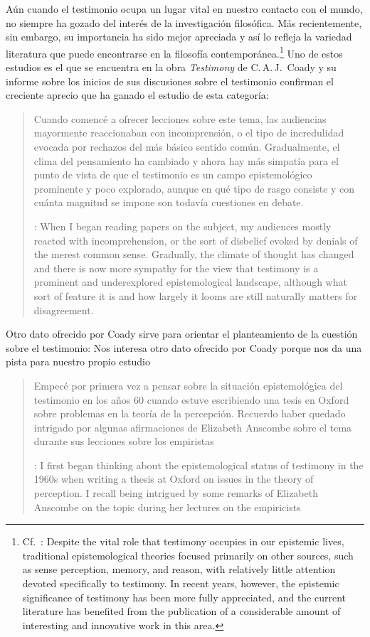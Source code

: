 Aún cuando el testimonio ocupa un lugar vital en nuestro contacto con el mundo,
no siempre ha gozado del interés de la investigación filosófica. Más
recientemente, sin embargo, su importancia ha sido mejor apreciada y así lo
refleja la variedad literatura que puede encontrarse en la filosofía
contemporánea.\footnote{Cf.~\cite[1]{lackeysosa2006eptest}: Despite the vital
  role that testimony occupies in our epistemic lives, traditional
  epistemological theories focused primarily on other sources, such as sense
  perception, memory, and reason, with relatively little attention devoted
  specifically to testimony. In recent years, however, the epistemic
  significance of testimony has been more fully appreciated, and the current
  literature has benefited from the publication of a considerable amount of
  interesting and innovative work in this area.} Uno de estos estudios es el que
se encuentra en la obra \emph{Testimony} de C.\,A.\,J.~Coady y su informe sobre
los inicios de sus discusiones sobre el testimonio confirman el creciente
aprecio que ha ganado el estudio de esta categoría:
\blockquote[{\cite[vii]{coady1992test}}: When I began reading papers on the
subject, my audiences mostly reacted with incomprehension, or the sort of
disbelief evoked by denials of the merest common sense. Gradually, the climate
of thought has changed and there is now more sympathy for the view that
testimony is a prominent and underexplored epistemological landscape, although
what sort of feature it is and how largely it looms are still naturally matters
for disagreement.]{Cuando comencé a ofrecer lecciones sobre este tema, las
  audiencias mayormente reaccionaban con incomprensión, o el tipo de
  incredulidad evocada por rechazos del más básico sentido común. Gradualmente,
  el clima del pensamiento ha cambiado y ahora hay más simpatía para el punto de
  vista de que el testimonio es un campo epistemológico prominente y poco
  explorado, aunque en qué tipo de rasgo consiste y con cuánta magnitud se
  impone son todavía cuestiones en debate.}
Otro dato ofrecido por Coady sirve para orientar el planteamiento de la cuestión
sobre el testimonio:
Nos interesa otro dato ofrecido por Coady porque nos da una pista para nuestro
propio estudio
\blockquote[{\cite[vii]{coady1992test}}: I first began thinking about the
epistemological status of testimony in the 1960s when writing a thesis at Oxford
on issues in the theory of perception. \textelp{} I recall being intrigued by
some remarks of Elizabeth Anscombe on the topic during her lectures on the
empiricists \textelp{}]{Empecé por primera vez a pensar sobre la situación
  epistemológica del testimonio en los años 60 cuando estuve escribiendo una
  tesis en Oxford sobre problemas en la teoría de la percepción. \textelp{}
  Recuerdo haber quedado intrigado por algunas afirmaciones de Elizabeth
  Anscombe sobre el tema durante sus lecciones sobre los empiristas \textelp{}}

